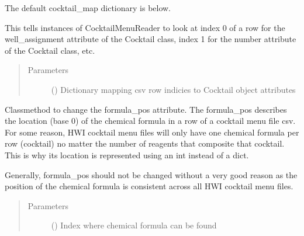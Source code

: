 \documentclass[letterpaper,10pt,english]{sphinxmanual}
\begin{document}
\begin{fulllineitems}
\begin{fulllineitems}
The default cocktail\_map dictionary is below.

\begin{sphinxVerbatim}[commandchars=\\\{\}]
  
\end{sphinxVerbatim}

This tells instances of CocktailMenuReader to look at index 0 of a row
for the well\_assignment attribute of the Cocktail class, index 1 for
the number attribute of the Cocktail class, etc.
\begin{quote}\begin{description}
\item[{Parameters}] \leavevmode
{} () \textendash{} Dictionary mapping csv row indicies to Cocktail object
attributes

\end{description}\end{quote}

\end{fulllineitems}


\begin{fulllineitems}
\label{\detokenize{polo.utils:polo.utils.io_utils.CocktailMenuReader.set_formula_pos}}
Classmethod to change the formula\_pos attribute. The formula\_pos
describes the location (base 0) of the chemical formula in a row of
a cocktail menu file csv. For some reason, HWI cocktail menu files
will only have one chemical formula per row (cocktail) no matter
the number of reagents that composite that cocktail. This is why
its location is represented using an int instead of a dict.

Generally, formula\_pos should not be changed without a very good
reason as the position of the chemical formula is consistent across
all HWI cocktail menu files.
\begin{quote}\begin{description}
\item[{Parameters}] \leavevmode
{} () \textendash{} Index where chemical formula can be found

\end{description}\end{quote}

\end{fulllineitems}


\end{fulllineitems}
\end{document}
